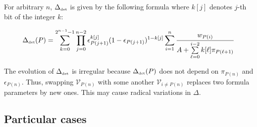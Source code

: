 \documentclass[11pt]{llncs}
\begin{document}
For arbitrary $n$, $\Delta_{\mbox{{\tiny det}}}$ is given by the following formula where $k[j]$ denotes $j$-th bit of the integer $k$:

$$\Delta_{\mbox{{\tiny det}}}(P)=\sum_{k=0}^{2^{n-1}-1}\prod_{j=0}^{n-2} \epsilon_{P(j+1)}^{k[j]} (1-\epsilon_{P(j+1)})^{1-k[j]} \sum_{i=1}^n \frac{w_{P(i)}}{A+\sum\limits_{\ell=0}^{i-2} k[\ell] \pi_{P(\ell+1)}}$$

The evolution of $\Delta_{\mbox{{\tiny det}}}$ is irregular because $\Delta_{\mbox{{\tiny det}}}(P)$ does not depend on $\pi_{P(n)}$ and $\epsilon_{P(n)}$. Thus, swapping $\mathcal{V}_{P(n)}$ with some another $\mathcal{V}_{i\neq P(n)}$ replaces two formula parameters by new ones. This may cause radical variations in $\Delta$.%

\subsection{Particular cases}
\end{document}
